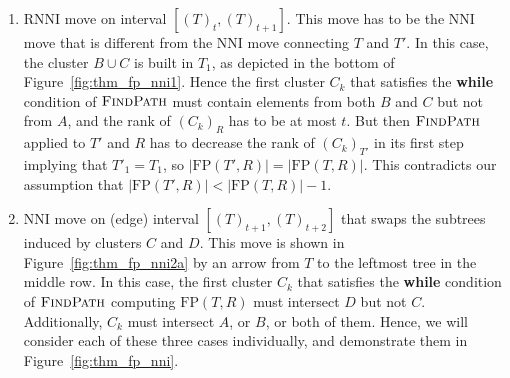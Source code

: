 \documentclass[11pt]{amsart}
\newcommand{\rnni}{\mathrm{RNNI}}
\newcommand{\findpath}{\textsc{FindPath}}
\newcommand{\nni}{\mathrm{NNI}}
\newcommand{\fp}{\mathrm{FP}}
\begin{document}
\begin{enumerate}[label = 1.{\arabic*}]
\item $\rnni$ move on interval $[(T)_t, (T)_{t+1}]$.
This move has to be the $\nni$ move that is different from the $\nni$ move connecting $T$ and $T'$.
In this case, the cluster $B \cup C$ is built in $T_1$, as depicted in the bottom of Figure~\ref{fig:thm_fp_nni1}.
Hence the first cluster $C_k$ that satisfies the \textbf{while} condition of $\findpath$ must contain elements from both $B$ and $C$ but not from $A$, and the rank of $(C_k)_R$ has to be at most $t$.
But then $\findpath$ applied to $T'$ and $R$ has to decrease the rank of $(C_k)_{T'}$ in its first step implying that $T'_1 = T_1$, so $|\fp(T',R)| = |\fp(T,R)|$.
This contradicts our assumption that $|\fp(T',R)| < |\fp(T,R)| - 1$.

\item $\nni$ move on (edge) interval $[(T)_{t+1}, (T)_{t+2}]$ that swaps the subtrees induced by clusters $C$ and $D$.
This move is shown in Figure~\ref{fig:thm_fp_nni2a} by an arrow from $T$ to the leftmost tree in the middle row.
In this case, the first cluster $C_k$ that satisfies the \textbf{while} condition of $\findpath$ computing $\fp(T, R)$ must intersect $D$ but not $C$.
Additionally, $C_k$ must intersect $A$, or $B$, or both of them.
Hence, we will consider each of these three cases individually, and demonstrate them in Figure~\ref{fig:thm_fp_nni}.


\end{enumerate}
\end{document}
